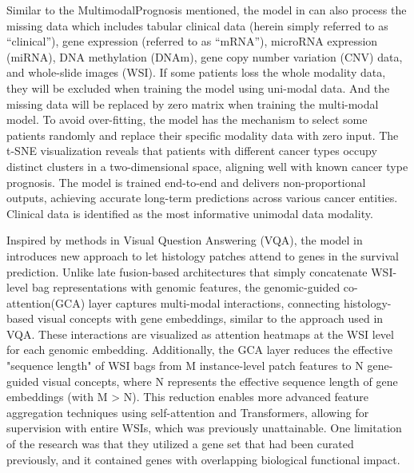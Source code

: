 \documentclass[journal,twoside,web]{ieeecolor}
\begin{document}
Similar to the MultimodalPrognosis mentioned, the model in \cite{vale2021long} can also process the missing data which includes tabular clinical data (herein simply referred to as “clinical”), gene expression (referred to as “mRNA”), microRNA expression (miRNA), DNA methylation (DNAm), gene copy number variation (CNV) data, and whole-slide images (WSI).
If some patients loss the whole modality data, they will be excluded when training the model using uni-modal data.
And the missing data will be replaced by zero matrix when training the multi-modal model.
To avoid over-fitting, the model has the mechanism to select some patients randomly and replace their specific modality data with zero input.
The t-SNE visualization reveals that patients with different cancer types occupy distinct clusters in a two-dimensional space, aligning well with known cancer type prognosis.
The model is trained end-to-end and delivers non-proportional outputs, achieving accurate long-term predictions across various cancer entities. 
Clinical data is identified as the most informative unimodal data modality.

Inspired by methods in Visual Question Answering (VQA), the model in \cite{chen2021multimodal} introduces new approach to let histology patches attend to genes in the survival prediction.
Unlike late fusion-based architectures that simply concatenate WSI-level bag representations with genomic features, the genomic-guided co-attention(GCA) layer captures multi-modal interactions, connecting histology-based visual concepts with gene embeddings, similar to the approach used in VQA.  
These interactions are visualized as attention heatmaps at the WSI level for each genomic embedding.
Additionally, the GCA layer reduces the effective "sequence length" of WSI bags from M instance-level patch features to N gene-guided visual concepts, where N represents the effective sequence length of gene embeddings (with M > N). 
This reduction enables more advanced feature aggregation techniques using self-attention and Transformers, allowing for supervision with entire WSIs, which was previously unattainable.
One limitation of the research was that they utilized a gene set that had been curated previously, and it contained genes with overlapping biological functional impact.
\end{document}
